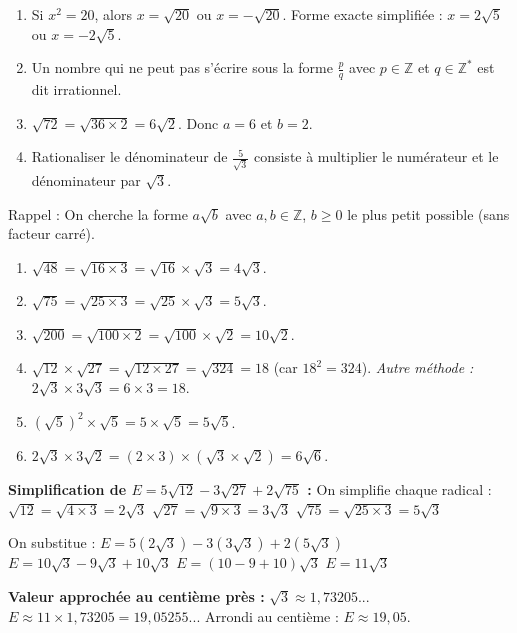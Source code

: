 \documentclass[11pt]{article}
\newcommand{\cle}[1]{{\popxbold\color{popdark}#1}}
\begin{document}
\begin{corrige}
\begin{enumerate}
    \item Si $x^2 = 20$, alors $x = \sqrt{20}$ ou $x = -\sqrt{20}$. \cle{Forme exacte simplifiée} : $x = 2\sqrt{5}$ ou $x = -2\sqrt{5}$.
    \item Un nombre qui ne peut pas s'écrire sous la forme $\frac{p}{q}$ avec $p \in \mathbb{Z}$ et $q \in \mathbb{Z}^*$ est dit \cle{irrationnel}.
    \item $\sqrt{72} = \sqrt{36 \times 2} = 6\sqrt{2}$. Donc $a = 6$ et $b = 2$.
    \item \cle{Rationaliser le dénominateur} de $\frac{5}{\sqrt{3}}$ consiste à multiplier le numérateur et le dénominateur par \textbf{$\sqrt{3}$}.
\end{enumerate}
\end{corrige}

\begin{corrige}
Rappel : On cherche la forme $a\sqrt{b}$ avec $a,b \in \mathbb{Z}$, $b \ge 0$ le plus petit possible (sans facteur carré).
\begin{enumerate}
    \item $\sqrt{48} = \sqrt{16 \times 3} = \sqrt{16}\times\sqrt{3} = 4\sqrt{3}$.
    \item $\sqrt{75} = \sqrt{25 \times 3} = \sqrt{25}\times\sqrt{3} = 5\sqrt{3}$.
    \item $\sqrt{200} = \sqrt{100 \times 2} = \sqrt{100}\times\sqrt{2} = 10\sqrt{2}$.
    \item $\sqrt{12} \times \sqrt{27} = \sqrt{12 \times 27} = \sqrt{324} = 18$ (car $18^2=324$). \textit{Autre méthode :} $2\sqrt{3} \times 3\sqrt{3} = 6 \times 3 = 18$.
    \item $(\sqrt{5})^2 \times \sqrt{5} = 5 \times \sqrt{5} = 5\sqrt{5}$.
    \item $2\sqrt{3} \times 3\sqrt{2} = (2\times 3) \times (\sqrt{3}\times\sqrt{2}) = 6\sqrt{6}$.
\end{enumerate}
\end{corrige}

\begin{corrige}
\textbf{Simplification de $E = 5\sqrt{12} - 3\sqrt{27} + 2\sqrt{75}$ :}
On simplifie chaque radical :
$\sqrt{12} = \sqrt{4\times 3} = 2\sqrt{3}$
$\sqrt{27} = \sqrt{9\times 3} = 3\sqrt{3}$
$\sqrt{75} = \sqrt{25\times 3} = 5\sqrt{3}$

On substitue :
$E = 5(2\sqrt{3}) - 3(3\sqrt{3}) + 2(5\sqrt{3})$
$E = 10\sqrt{3} - 9\sqrt{3} + 10\sqrt{3}$
$E = (10 - 9 + 10)\sqrt{3}$
$E = 11\sqrt{3}$

\textbf{Valeur approchée au centième près :}
$\sqrt{3} \approx 1,73205...$
$E \approx 11 \times 1,73205 = 19,05255...$
Arrondi au centième : $\boxed{E \approx 19,05}$.
\end{corrige}
\end{document}
